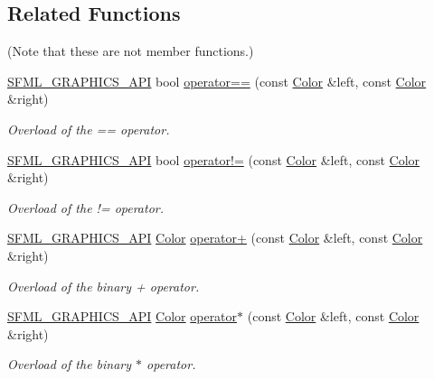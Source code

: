 \subsection*{Related Functions}
(Note that these are not member functions.) \begin{DoxyCompactItemize}
\item 
\hyperlink{_graphics_2_export_8hpp_ab84c9f1035e146917de3bc0f98d72b35}{S\-F\-M\-L\-\_\-\-G\-R\-A\-P\-H\-I\-C\-S\-\_\-\-A\-P\-I} bool \hyperlink{classsf_1_1_color_a7498d4670c7655e8d4d91ef49cc6064e}{operator==} (const \hyperlink{classsf_1_1_color}{Color} \&left, const \hyperlink{classsf_1_1_color}{Color} \&right)
\begin{DoxyCompactList}\small\item\em Overload of the == operator. \end{DoxyCompactList}\item 
\hyperlink{_graphics_2_export_8hpp_ab84c9f1035e146917de3bc0f98d72b35}{S\-F\-M\-L\-\_\-\-G\-R\-A\-P\-H\-I\-C\-S\-\_\-\-A\-P\-I} bool \hyperlink{classsf_1_1_color_a5d6501b7dd05f481b79f7163899f1d92}{operator!=} (const \hyperlink{classsf_1_1_color}{Color} \&left, const \hyperlink{classsf_1_1_color}{Color} \&right)
\begin{DoxyCompactList}\small\item\em Overload of the != operator. \end{DoxyCompactList}\item 
\hyperlink{_graphics_2_export_8hpp_ab84c9f1035e146917de3bc0f98d72b35}{S\-F\-M\-L\-\_\-\-G\-R\-A\-P\-H\-I\-C\-S\-\_\-\-A\-P\-I} \hyperlink{classsf_1_1_color}{Color} \hyperlink{classsf_1_1_color_a90e79ecc276114cda519a88119ac645b}{operator+} (const \hyperlink{classsf_1_1_color}{Color} \&left, const \hyperlink{classsf_1_1_color}{Color} \&right)
\begin{DoxyCompactList}\small\item\em Overload of the binary + operator. \end{DoxyCompactList}\item 
\hyperlink{_graphics_2_export_8hpp_ab84c9f1035e146917de3bc0f98d72b35}{S\-F\-M\-L\-\_\-\-G\-R\-A\-P\-H\-I\-C\-S\-\_\-\-A\-P\-I} \hyperlink{classsf_1_1_color}{Color} \hyperlink{classsf_1_1_color_aa9de267d831b4ec8ba65b627e51d50c3}{operator$\ast$} (const \hyperlink{classsf_1_1_color}{Color} \&left, const \hyperlink{classsf_1_1_color}{Color} \&right)
\begin{DoxyCompactList}\small\item\em Overload of the binary $\ast$ operator. \end{DoxyCompactList}\item 

\end{DoxyCompactItemize}
